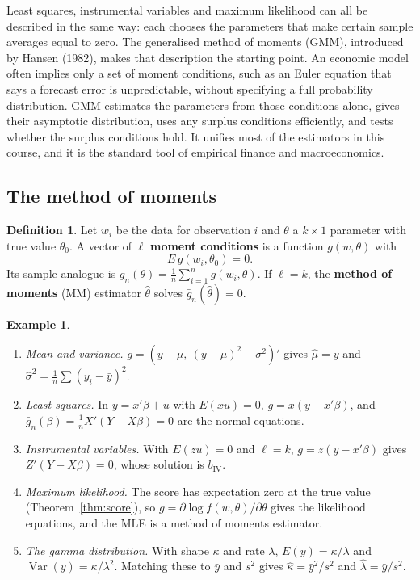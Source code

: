 \documentclass[11pt,a4paper]{article}
\numberwithin{equation}{section}
\DeclareMathOperator{\Var}{Var}
\theoremstyle{definition}
\newtheorem{defn}[thm]{Definition}
\newtheorem{exa}[thm]{Example}
\begin{document}
Least squares, instrumental variables and maximum likelihood can all be described in the same way: each chooses the parameters that make certain
sample averages equal to zero. The generalised method of moments (GMM), introduced by Hansen (1982), makes that description the starting point. An
economic model often implies only a set of moment conditions, such as an Euler equation that says a forecast error is unpredictable, without
specifying a full probability distribution. GMM estimates the parameters from those conditions alone, gives their asymptotic distribution, uses any
surplus conditions efficiently, and tests whether the surplus conditions hold. It unifies most of the estimators in this course, and it is the
standard tool of empirical finance and macroeconomics.

\subsection{The method of moments}
\label{ssec:mm}

\begin{defn}
Let $w_i$ be the data for observation $i$ and $\theta$ a $k \times 1$ parameter with true value $\theta_0$. A vector of $\ell$ \textbf{moment conditions} is a function $g(w, \theta)$ with
\[
E\,g(w_i, \theta_0) = 0 .
\]
Its sample analogue is $\bar g_n(\theta) = \frac1n\sum_{i=1}^ng(w_i, \theta)$. If $\ell = k$, the \textbf{method of moments} (MM) estimator $\hat\theta$ solves $\bar g_n(\hat\theta) = 0$.
\end{defn}

\begin{exa}
\label{ex:mmexamples}
\begin{enumerate}[label=(\alph*)]
\item \emph{Mean and variance.} $g = (y - \mu,\ (y - \mu)^2 - \sigma^2)'$ gives $\hat\mu = \bar y$ and $\hat\sigma^2 = \frac1n\sum(y_i - \bar y)^2$.
\item \emph{Least squares.} In $y = x'\beta + u$ with $E(xu) = 0$, $g = x(y - x'\beta)$, and $\bar g_n(\beta) = \frac1nX'(Y - X\beta) = 0$ are the normal equations.
\item \emph{Instrumental variables.} With $E(zu) = 0$ and $\ell = k$, $g = z(y - x'\beta)$ gives $Z'(Y - X\beta) = 0$, whose solution is $b_{\text{IV}}$.
\item \emph{Maximum likelihood.} The score has expectation zero at the true value (Theorem~\ref{thm:score}), so $g = \partial\log f(w, \theta)/\partial\theta$ gives the likelihood
equations, and the MLE is a method of moments estimator.
\item \emph{The gamma distribution.} With shape $\kappa$ and rate $\lambda$, $E(y) = \kappa/\lambda$ and $\Var(y) = \kappa/\lambda^2$. Matching these to $\bar y$ and $s^2$ gives $\hat\kappa = \bar y^2/s^2$ and
$\hat\lambda = \bar y/s^2$.
\end{enumerate}
\end{exa}
\end{document}
